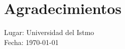 \chapter*{Agradecimientos}

\lipsum[66]

\vspace*{1.5cm}
\begin{flushright}
\authorname
\end{flushright}


\vspace*{-1.3cm}
\noindent
Lugar: Universidad del Istmo\\
Fecha: \today 
